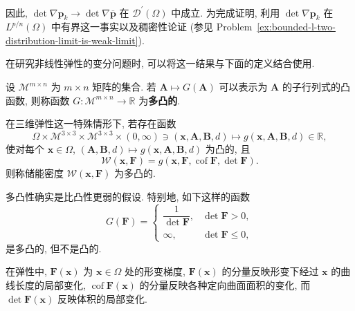 \begin{Proof}
因此, $\det\nabla\bm{p}_k\to\det\nabla\overline{\bm{p}}$ 在 $\mathcal{D}^{\prime}(\Omega)$ 中成立. 为完成证明, 利用 $\det\nabla\bm{p}_k$ 在 $L^{p/n}(\Omega)$ 中有界这一事实以及稠密性论证 (参见 Problem~\ref{ex:bounded-l-two-distribution-limit-is-weak-limit}).
\end{Proof}
\endgroup

在研究非线性弹性的变分问题时, 可以将这一结果与下面的定义结合使用.

\begin{Definition}
\label{def:polyconvex-function}
设 $\mathcal{M}^{m\times n}$ 为 $m\times n$ 矩阵的集合. 若 $\bm{A}\mapsto G(\bm{A})$ 可以表示为 $\bm{A}$ 的子行列式的凸函数, 则称函数 $G:\mathcal{M}^{m\times n}\to\mathbb{R}$ 为\textbf{多凸的}.
\end{Definition}

在三维弹性这一特殊情形下, 若存在函数
\begin{equation}\label{eq:polyconvex-elastic-energy-convex-representation-map}
\Omega\times\mathcal{M}^{3\times3}\times\mathcal{M}^{3\times3}\times(0,\infty)\ni(\bm{x},\bm{A},\bm{B},d)\mapsto g(\bm{x},\bm{A},\bm{B},d)\in\mathbb{R},
\end{equation}
使对每个 $\bm{x}\in\Omega$, $(\bm{A},\bm{B},d)\mapsto g(\bm{x},\bm{A},\bm{B},d)$ 为凸的, 且
\begin{equation}\label{eq:polyconvex-elastic-energy-gradient-minor-representation}
\mathcal{W}(\bm{x},\bm{F})=g(\bm{x},\bm{F},\operatorname{cof}\bm{F},\det\bm{F}).
\end{equation}
则称储能密度 $\mathcal{W}(\bm{x},\bm{F})$ 为多凸的.

\begin{Remark}
\label{rem:polyconvexity-weaker-than-convexity}
多凸性确实是比凸性更弱的假设. 特别地, 如下这样的函数
\begin{equation}\label{eq:polyconvex-nonconvex-inverse-determinant-example}
G(\bm{F})=\begin{cases}\dfrac{1}{\det\bm{F}},&\det\bm{F}>0,\\\infty,&\det\bm{F}\leq0,\end{cases}
\end{equation}
是多凸的, 但不是凸的.
\end{Remark}

\begin{Remark}
\label{rem:deformation-minors-geometric-meaning}
在弹性中, $\bm{F}(\bm{x})$ 为 $\bm{x}\in\Omega$ 处的形变梯度, $\bm{F}(\bm{x})$ 的分量反映形变下经过 $\bm{x}$ 的曲线长度的局部变化, $\operatorname{cof}\bm{F}(\bm{x})$ 的分量反映各种定向曲面面积的变化, 而 $\det\bm{F}(\bm{x})$ 反映体积的局部变化.
\end{Remark}

